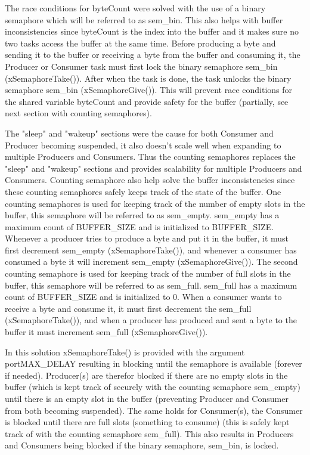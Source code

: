 The race conditions for byteCount were solved with the use of a binary semaphore which will be referred to as sem\_bin. This also helps with buffer inconsistencies since byteCount is the index into the buffer and it makes sure no two tasks access the buffer at the same time. Before producing a byte and sending it to the buffer or receiving a byte from the buffer and consuming it, the Producer or Consumer task must first lock the binary semaphore sem\_bin (xSemaphoreTake()). After when the task is done, the task unlocks the binary semaphore sem\_bin (xSemaphoreGive()). This will prevent race conditions for the shared variable byteCount and provide safety for the buffer (partially, see next section with counting semaphores). 

The "sleep" and "wakeup" sections were the cause for both Consumer and Producer becoming suspended, it also doesn't scale well when expanding to multiple Producers and Consumers. Thus the counting semaphores replaces the "sleep" and "wakeup" sections and provides scalability for multiple Producers and Consumers. Counting semaphore also help solve the buffer inconsistencies since these counting semaphores safely keeps track of the state of the buffer. One counting semaphores is used for keeping track of the number of empty slots in the buffer, this semaphore will be referred to as sem\_empty. sem\_empty has a maximum count of BUFFER\_SIZE and is initialized to BUFFER\_SIZE. Whenever a producer tries to produce a byte and put it in the buffer, it must first decrement sem\_empty (xSemaphoreTake()), and whenever a consumer has consumed a byte it will increment sem\_empty (xSemaphoreGive()). The second counting semaphore is used for keeping track of the number of full slots in the buffer, this semaphore will be referred to as sem\_full. sem\_full has a maximum count of BUFFER\_SIZE and is initialized to 0. When a consumer wants to receive a byte and consume it, it must first decrement the sem\_full (xSemaphoreTake()), and when a producer has produced and sent a byte to the buffer it must increment sem\_full (xSemaphoreGive()). 

In this solution xSemaphoreTake() is provided with the argument portMAX\_DELAY resulting in blocking until the semaphore is available (forever if needed). Producer(s) are therefor blocked if there are no empty slots in the buffer (which is kept track of securely with the counting semaphore sem\_empty) until there is an empty slot in the buffer (preventing Producer and Consumer from both becoming suspended). The same holds for Consumer(s), the Consumer is blocked until there are full slots (something to consume) (this is safely kept track of with the counting semaphore sem\_full). This also results in Producers and Consumers being blocked if the binary semaphore, sem\_bin, is locked.


